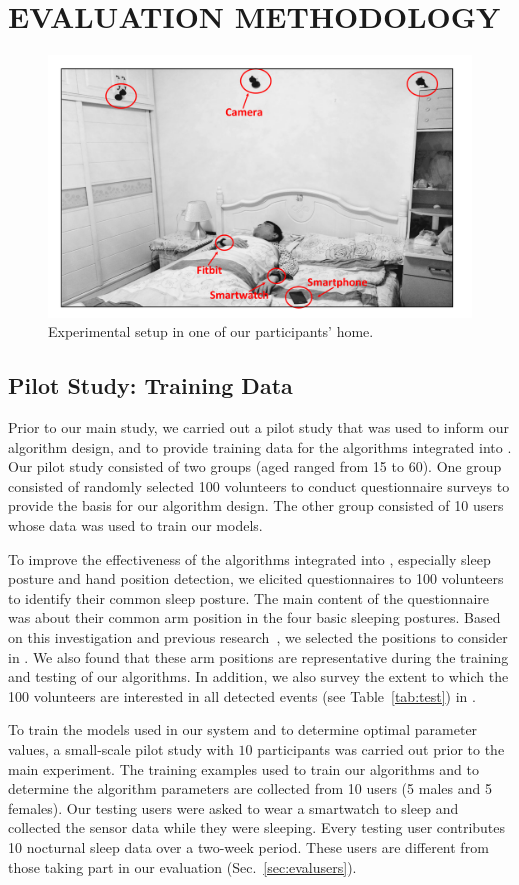 \section{EVALUATION METHODOLOGY}\label{sec:expsetup}


\begin{figure}[!t]
	\centering
	\includegraphics[width=0.57\linewidth]{Figures/setup.pdf}
	\caption{Experimental setup in one of our participants' home. }\label{fig:setup}
\end{figure}

\subsection{{Pilot Study: Training Data}}\label{sec:trainingdata}

Prior to our main study, we carried out a pilot study that was used to inform our algorithm design, and to provide training data for the
algorithms integrated into {\systemname}. Our pilot study consisted of two groups (aged ranged from 15 to 60). One group   {consisted of}
randomly selected 100 volunteers to conduct questionnaire surveys to provide the basis for our algorithm design. The other group consisted
of 10 users whose data was used to train our models.


To improve the effectiveness of the algorithms integrated into {\systemname}, especially sleep posture and hand position detection, we
elicited questionnaires to 100 volunteers to identify their common sleep posture. The main content of the questionnaire was about their
common arm position in the four basic sleeping postures. Based on this investigation and previous
research~\cite{position2014,HandPosition2}, we selected the positions to consider in {\systemname}. We also found that these arm positions
are representative during the training and testing of our algorithms. In addition, we also survey the extent to which the 100 volunteers are interested in all detected events (see Table~\ref{tab:test}) in {\systemname}.

To train the models used in our system and to determine optimal parameter values, a small-scale pilot study with $10$ participants was
carried out prior to the main experiment. The training examples used to train our algorithms and to determine the algorithm parameters are
collected from 10 users (5 males and 5 females). Our testing users were asked to wear a smartwatch to sleep and collected the sensor data
while they were sleeping. Every testing user contributes 10 nocturnal sleep data over a two-week period. These users are different from
those taking part in our evaluation (Sec.~\ref{sec:evalusers}).


